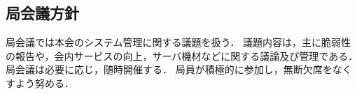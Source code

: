 \subsection*{局会議方針}


局会議では本会のシステム管理に関する議題を扱う．
議題内容は，主に脆弱性の報告や，会内サービスの向上，サーバ機材などに関する議論及び管理である．
局会議は必要に応じ，随時開催する．
局員が積極的に参加し，無断欠席をなくすよう努める．
